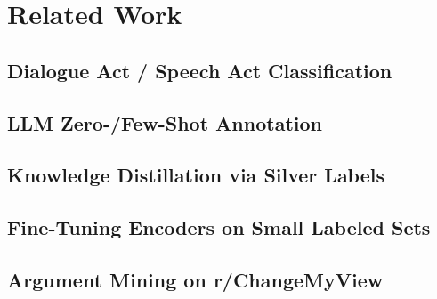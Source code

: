 \chapter{Related Work}
\label{k:relatedwork}


\section{Dialogue Act / Speech Act Classification}

\section{LLM Zero-/Few-Shot Annotation}

\section{Knowledge Distillation via Silver Labels}

\section{Fine-Tuning Encoders on Small Labeled Sets}

\section{Argument Mining on r/ChangeMyView}


